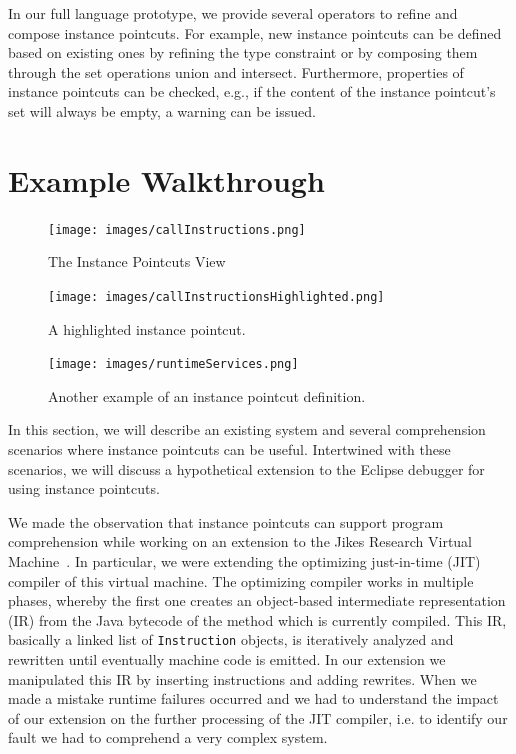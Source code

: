 \documentclass{sig-alternate}
\begin{document}
In our full language prototype, we provide several operators to refine and compose instance pointcuts.
For example, new instance pointcuts can be defined based on existing ones by refining the type constraint or by composing them through the set operations union and intersect.
Furthermore, properties of instance pointcuts can be checked, e.g., if the content of the instance pointcut's set will always be empty, a warning can be issued.


\section{Example Walkthrough}
\label{sec:walkthrough}

\begin{figure}[t!]
\begin{minipage}[t]{0.3333\textwidth}
\centering
\texttt{[image: images/callInstructions.png]}
\caption{The Instance Pointcuts View}
\label{fig:ip-view}
\end{minipage}
\begin{minipage}[t]{0.3333\textwidth}
\centering
\texttt{[image: images/callInstructionsHighlighted.png]}
\caption{A highlighted instance pointcut.}
\label{fig:ip-view-highlight}
\end{minipage}
\begin{minipage}[t]{0.3333\textwidth}
\centering
\texttt{[image: images/runtimeServices.png]}
\caption{Another example of an instance pointcut definition.}
\label{fig:ip-view-runtimeServices}
\end{minipage}
\end{figure}

In this section, we will describe an existing system and several comprehension scenarios where instance pointcuts can be useful.
Intertwined with these scenarios, we will discuss a hypothetical extension to the Eclipse debugger for using instance pointcuts.

We made the observation that instance pointcuts can support program comprehension while working on an extension to the Jikes Research Virtual Machine~\cite{Alpern2005}.
In particular, we were extending the optimizing just-in-time (JIT) compiler of this virtual machine.
The optimizing compiler works in multiple phases, whereby the first one creates an object-based intermediate representation (IR) from the Java bytecode of the method which is currently compiled.
This IR, basically a linked list of \lstinline!Instruction! objects, is iteratively analyzed and rewritten until eventually machine code is emitted.
In our extension we manipulated this IR by inserting instructions and adding rewrites.
When we made a mistake runtime failures occurred and we had to understand the impact of our extension on the further processing of the JIT compiler, i.e. to identify our fault we had to comprehend a very complex system.
\end{document}
